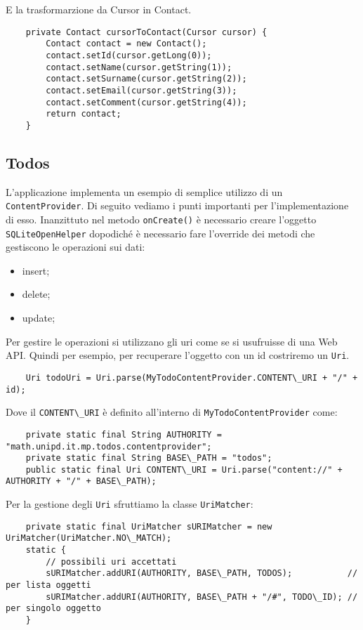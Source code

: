 	E la trasformarzione da Cursor in Contact.
	\begin{lstlisting}
	private Contact cursorToContact(Cursor cursor) {
		Contact contact = new Contact();
		contact.setId(cursor.getLong(0));
		contact.setName(cursor.getString(1));
		contact.setSurname(cursor.getString(2));
		contact.setEmail(cursor.getString(3));
		contact.setComment(cursor.getString(4));
		return contact;
	}
	\end{lstlisting}


	\subsection{Todos}
	L'applicazione implementa un esempio di semplice utilizzo di un \lstinline|ContentProvider|. Di seguito vediamo i punti importanti per l'implementazione di esso. Inanzittuto nel metodo \lstinline|onCreate()| è necessario creare l'oggetto \lstinline|SQLiteOpenHelper| dopodiché è necessario fare l'override dei metodi che gestiscono le operazioni sui dati:
	\begin{itemize}
		\item insert;
		\item delete;
		\item update;
	\end{itemize}

	Per gestire le operazioni si utilizzano gli uri come se si usufruisse di una Web API. Quindi per esempio, per recuperare l'oggetto con un id costriremo un \lstinline|Uri|.
	\begin{lstlisting}
	Uri todoUri = Uri.parse(MyTodoContentProvider.CONTENT\_URI + "/" + id);
	\end{lstlisting}

	Dove il \lstinline|CONTENT\_URI| è definito all'interno di \lstinline|MyTodoContentProvider| come:
	\begin{lstlisting}
	private static final String AUTHORITY = "math.unipd.it.mp.todos.contentprovider";
	private static final String BASE\_PATH = "todos";
	public static final Uri CONTENT\_URI = Uri.parse("content://" + AUTHORITY + "/" + BASE\_PATH);
	\end{lstlisting}

	Per la gestione degli \lstinline|Uri| sfruttiamo la classe \lstinline|UriMatcher|:
	\begin{lstlisting}
	private static final UriMatcher sURIMatcher = new UriMatcher(UriMatcher.NO\_MATCH);
	static {
		// possibili uri accettati
		sURIMatcher.addURI(AUTHORITY, BASE\_PATH, TODOS);			// per lista oggetti
		sURIMatcher.addURI(AUTHORITY, BASE\_PATH + "/#", TODO\_ID);	// per singolo oggetto
	}
	\end{lstlisting}

